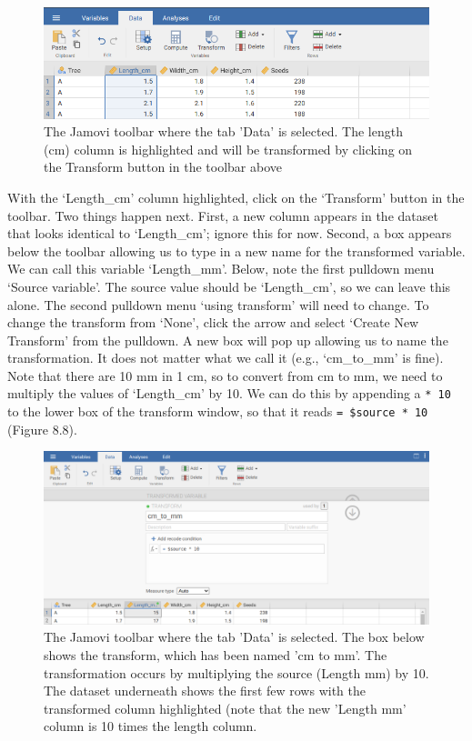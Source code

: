 \documentclass[
]{scrbook}
\begin{document}
\begin{figure}
\includegraphics[width=1\linewidth]{img/jamovi_transform_fig_length} \caption{The Jamovi toolbar where the tab 'Data' is selected. The length (cm) column is highlighted and will be transformed by clicking on the Transform button in the toolbar above}\label{fig:unnamed-chunk-28}
\end{figure}

With the `Length\_cm' column highlighted, click on the `Transform' button in the toolbar.
Two things happen next.
First, a new column appears in the dataset that looks identical to `Length\_cm'; ignore this for now.
Second, a box appears below the toolbar allowing us to type in a new name for the transformed variable.
We can call this variable `Length\_mm'.
Below, note the first pulldown menu `Source variable'.
The source value should be `Length\_cm', so we can leave this alone.
The second pulldown menu `using transform' will need to change.
To change the transform from `None', click the arrow and select `Create New Transform' from the pulldown.
A new box will pop up allowing us to name the transformation.
It does not matter what we call it (e.g., `cm\_to\_mm' is fine).
Note that there are 10 mm in 1 cm, so to convert from cm to mm, we need to multiply the values of `Length\_cm' by 10.
We can do this by appending a \texttt{*\ 10} to the lower box of the transform window, so that it reads \texttt{=\ \$source\ *\ 10} (Figure 8.8).

\begin{figure}
\includegraphics[width=1\linewidth]{img/jamovi_transform_cm_to_mm} \caption{The Jamovi toolbar where the tab 'Data' is selected. The box below shows the transform, which has been named 'cm to mm'. The transformation occurs by multiplying the source (Length mm) by 10. The dataset underneath shows the first few rows with the transformed column highlighted (note that the new 'Length mm' column is 10 times the length column.}\label{fig:unnamed-chunk-29}
\end{figure}
\end{document}

